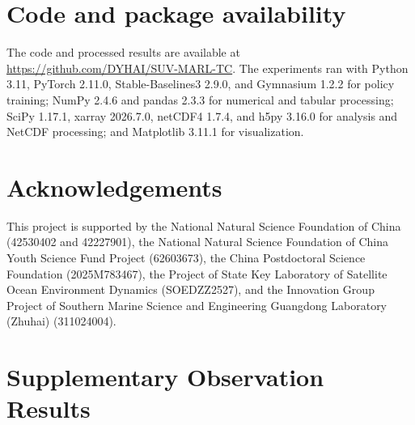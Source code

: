 \documentclass[a4paper,fleqn]{cas-dc}
\begin{document}
\section*{Code and package availability}
\begin{sloppypar}
The code and processed results are available at\newline
\url{https://github.com/DYHAI/SUV-MARL-TC}. The experiments ran with Python 3.11,
PyTorch 2.11.0, Stable-Baselines3 2.9.0, and Gymnasium
1.2.2 for policy training; NumPy 2.4.6 and pandas 2.3.3 for numerical and
tabular processing; SciPy 1.17.1, xarray 2026.7.0, netCDF4 1.7.4, and h5py
3.16.0 for analysis and NetCDF processing; and Matplotlib 3.11.1 for
visualization.
\end{sloppypar}

\section*{Acknowledgements}
\begin{sloppypar}
This project is supported by the National Natural Science Foundation of China
(42530402 and 42227901), the National Natural Science Foundation of China
Youth Science Fund Project (62603673), the China Postdoctoral Science
Foundation (2025M783467), the Project of State Key Laboratory of Satellite
Ocean Environment Dynamics (SOEDZZ2527), and the Innovation Group Project of
Southern Marine Science and Engineering Guangdong Laboratory (Zhuhai)
(311024004).
\end{sloppypar}

\printcredits

\clearpage
\appendix
\onecolumn

\section{Supplementary Observation Results}
\setcounter{figure}{0}
\renewcommand{\thefigure}{A.\arabic{figure}}
\renewcommand{\theHfigure}{A.\arabic{figure}}
\setcounter{table}{0}
\renewcommand{\thetable}{A.\arabic{table}}
\renewcommand{\theHtable}{A.\arabic{table}}
\end{document}
